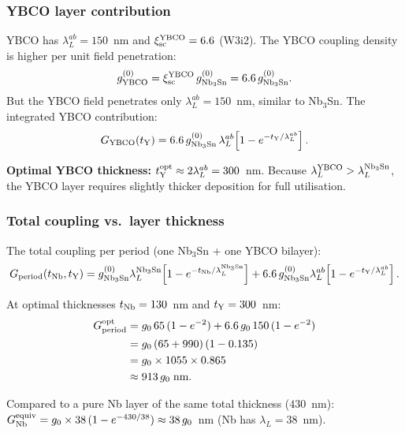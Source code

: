 \documentclass[11pt]{article}
\begin{document}
\subsubsection{YBCO layer contribution}

YBCO has $\lambda_L^{ab} = 150$~nm and $\xi_{\rm sc}^{\rm YBCO} = 6.6$
(W3i2). The YBCO coupling density is higher per unit field penetration:
\begin{equation}
g_{\rm YBCO}^{(0)} = \xi_{\rm sc}^{\rm YBCO}\,g_{\rm Nb_3Sn}^{(0)}
= 6.6\,g_{\rm Nb_3Sn}^{(0)}.
\label{eq:g-YBCO-bulk}
\end{equation}
But the YBCO field penetrates only $\lambda_L^{ab} = 150$~nm, similar to
Nb$_3$Sn. The integrated YBCO contribution:
\begin{equation}
G_{\rm YBCO}(t_{\rm Y}) = 6.6\,g_{\rm Nb_3Sn}^{(0)}\,\lambda_L^{ab}
  \!\left[1 - e^{-t_{\rm Y}/\lambda_L^{ab}}\right].
\label{eq:G-YBCO}
\end{equation}

\textbf{Optimal YBCO thickness:} $t_{\rm Y}^{\rm opt} \approx 2\lambda_L^{ab}
= 300$~nm. Because $\lambda_L^{\rm YBCO} > \lambda_L^{\rm Nb_3Sn}$, the
YBCO layer requires slightly thicker deposition for full utilisation.

\subsubsection{Total coupling vs.\ layer thickness}

The total coupling per period (one Nb$_3$Sn + one YBCO bilayer):
\begin{equation}
G_{\rm period}(t_{\rm Nb},t_{\rm Y})
= g_{\rm Nb_3Sn}^{(0)}\lambda_L^{\rm Nb_3Sn}\!\left[1-e^{-t_{\rm Nb}/\lambda_L^{\rm Nb_3Sn}}\right]
+ 6.6\,g_{\rm Nb_3Sn}^{(0)}\lambda_L^{ab}\!\left[1-e^{-t_{\rm Y}/\lambda_L^{ab}}\right].
\label{eq:G-period}
\end{equation}

At optimal thicknesses $t_{\rm Nb} = 130$~nm and $t_{\rm Y} = 300$~nm:
\begin{align}
G_{\rm period}^{\rm opt}
&= g_0\,65\,(1-e^{-2}) + 6.6\,g_0\,150\,(1-e^{-2}) \notag\\
&= g_0\,(65 + 990)\,(1-0.135) \notag\\
&= g_0 \times 1055 \times 0.865 \notag\\
&\approx 913\,g_0\;\text{nm}.
\label{eq:G-period-opt}
\end{align}

Compared to a pure Nb layer of the same total thickness ($430$~nm):
$G_{\rm Nb}^{\rm equiv} = g_0 \times 38\,(1-e^{-430/38}) \approx 38\,g_0$~nm
(Nb has $\lambda_L = 38$~nm).
\end{document}
